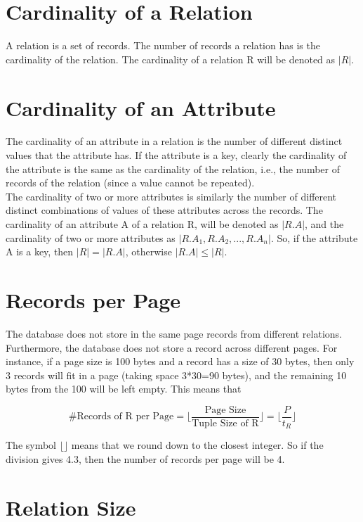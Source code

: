 \documentclass[12pt]{article}
\begin{document}
\section{Cardinality of a Relation}

A relation is a set of records. The number of records a relation has is the cardinality of the relation. The cardinality of a relation R will be denoted as $|R|$.

\section{Cardinality of an Attribute}

The cardinality of an attribute in a relation is the number of different distinct values that the attribute has. If the attribute is a key, clearly the cardinality of the attribute is the same as the cardinality of the relation, i.e., the number of records of the relation (since a value cannot be repeated). \\
The cardinality of two or more attributes is similarly the number of different distinct combinations of values of these attributes across the records.
The cardinality of an attribute A of a relation R, will be denoted as $|R.A|$, and the cardinality of two or more attributes as $|R.A_1, R.A_2, ..., R.A_n|$. So, if the attribute A is a key, then $|R| = |R.A|$, otherwise $|R.A| \le |R|$.

\section{Records per Page}
The database does not store in the same page records from different relations. Furthermore, the database does not store a record across different pages. For instance, if a page size is 100 bytes and a record has a size of 30 bytes, then only 3 records will fit in a page (taking space 3*30=90 bytes), and the remaining 10 bytes from the 100 will be left empty. This means that

$$
\text{\#Records of R per Page} = \Big\lfloor\frac{\text{Page Size}}{\text{Tuple Size of R}}\Big\rfloor = \Big\lfloor\frac{P}{t_R}\Big\rfloor
$$

The symbol $\lfloor \rfloor$ means that we round down to the closest integer. So if the division gives 4.3, then the number of records per page will be 4.

\section{Relation Size}
\end{document}
